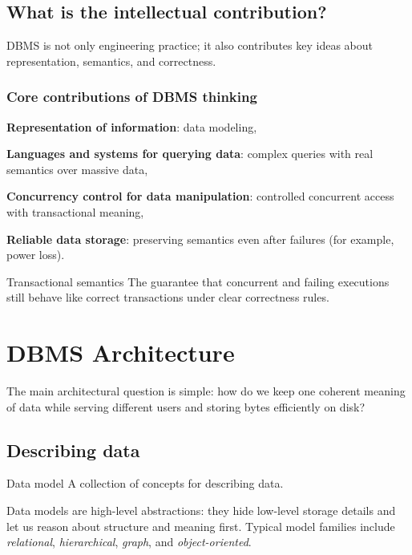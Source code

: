 \documentclass[../../dis.tex]{subfiles}
\begin{document}
\subsection{What is the intellectual contribution?}
DBMS is not only engineering practice; it also contributes key ideas about representation, semantics, and correctness.

\subsubsection{Core contributions of DBMS thinking}
\begin{dashlist}
    \item \textbf{Representation of information}: data modeling,
    \item \textbf{Languages and systems for querying data}: complex queries with real semantics over massive data,
    \item \textbf{Concurrency control for data manipulation}: controlled concurrent access with transactional meaning,
    \item \textbf{Reliable data storage}: preserving semantics even after failures (for example, power loss).
\end{dashlist}

\begin{concept}{Transactional semantics}
The guarantee that concurrent and failing executions still behave like correct transactions under clear correctness rules.
\end{concept}

\section{DBMS Architecture}
The main architectural question is simple: how do we keep one coherent meaning of data while serving different users and storing bytes efficiently on disk?

\subsection{Describing data}
\begin{concept}{Data model}
A collection of concepts for describing data.
\end{concept}

Data models are high-level abstractions: they hide low-level storage details and let us reason about structure and meaning first.
Typical model families include \emph{relational}, \emph{hierarchical}, \emph{graph}, and \emph{object-oriented}.
\end{document}
